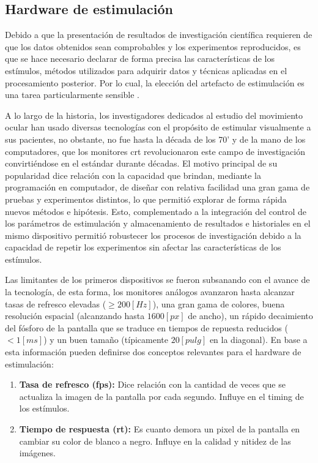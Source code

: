 \documentclass[../main.tex]{subfiles}
\begin{document}
		\subsection{Hardware de estimulación}
		\label{sub:02_hardware_de_estimulacion}
			Debido a que la presentación de resultados de investigación científica requieren de que los datos obtenidos sean comprobables y los experimentos reproducidos, es que se hace necesario declarar de forma precisa las características de los estímulos, métodos utilizados para adquirir datos y técnicas aplicadas en el procesamiento posterior. Por lo cual, la elección del artefacto de estimulación es una tarea particularmente sensible \cite{article:monitor_beuer}.

			A lo largo de la historia, los investigadores dedicados al estudio del movimiento ocular han usado diversas tecnologías con el propósito de estimular visualmente a sus pacientes, no obstante, no fue hasta la década de los 70' y de la mano de los computadores, que los monitores \acrshort{crt} revolucionaron este campo de investigación convirtiéndose en el estándar durante décadas. El motivo principal de su popularidad dice relación con la capacidad que brindan, mediante la programación en computador, de diseñar con relativa facilidad una gran gama de pruebas y experimentos distintos, lo que permitió explorar de forma rápida nuevos métodos e hipótesis. Esto, complementado a la integración del control de los parámetros de estimulación y almacenamiento de resultados e historiales en el mismo dispositivo permitió robustecer los procesos de investigación debido a la capacidad de repetir los experimentos sin afectar las características de los estímulos. 

			Las limitantes de los primeros dispositivos se fueron subsanando con el avance de la tecnología, de esta forma, los monitores análogos avanzaron hasta alcanzar tasas de refresco elevadas ($\geq 200[Hz]$), una gran gama de colores, buena resolución espacial (alcanzando hasta $1600[px]$ de ancho), un rápido decaimiento del fósforo de la pantalla que se traduce en tiempos de repuesta reducidos ($< 1[ms]$) y un buen tamaño (típicamente $20[pulg]$ en la diagonal). En base a esta información pueden definirse dos conceptos relevantes para el hardware de estimulación: 
			\begin{enumerate}\setlength\itemsep{-0.5em}
				\item \textbf{Tasa de refresco (\acrshort{fps}):} Dice relación con la cantidad de veces que se actualiza la imagen de la pantalla por cada segundo. Influye en el timing de los estímulos.
				\item \textbf{Tiempo de respuesta (\acrshort{rt}):} Es cuanto demora un pixel de la pantalla en cambiar su color de blanco a negro. Influye en la calidad y nitidez de las imágenes. 
			\end{enumerate}
\end{document}
